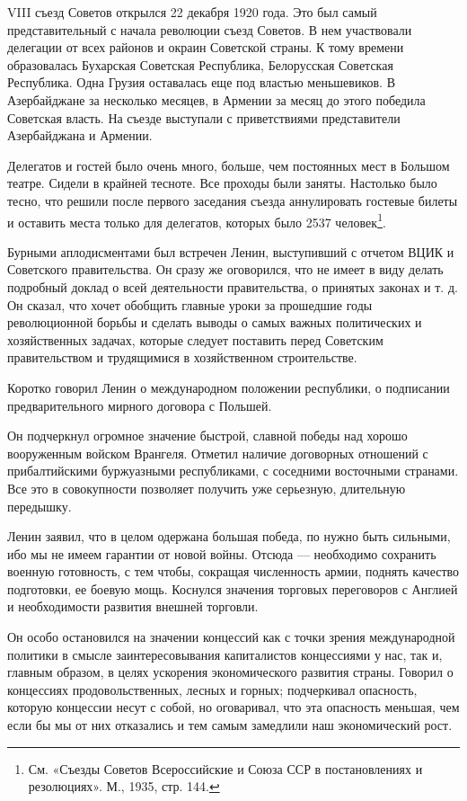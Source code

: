 \documentclass[12pt, a4paper, openany]{book}
\begin{document}
VIII съезд Советов открылся 22 декабря 1920 года. Это был самый представительный с начала революции съезд Советов. В нем участвовали делегации от всех районов и окраин Советской страны. К тому времени образовалась Бухарская Советская Республика, Белорусская Советская Республика. Одна Грузия оставалась еще под властью меньшевиков. В Азербайджане за несколько месяцев, в Армении за месяц до этого победила Советская власть. На съезде выступали с приветствиями представители Азербайджана и Армении.

Делегатов и гостей было очень много, больше, чем постоянных мест в Большом театре. Сидели в крайней тесноте. Все проходы были заняты. Настолько было тесно, что решили после первого заседания съезда аннулировать гостевые билеты и оставить места только для делегатов, которых было 2537 человек\footnote{См. «Съезды Советов Всероссийские и Союза ССР в постановлениях и резолюциях». М., 1935, стр. 144.}.

Бурными аплодисментами был встречен Ленин, выступивший с отчетом ВЦИК и Советского правительства. Он сразу же оговорился, что не имеет в виду делать подробный доклад о всей деятельности правительства, о принятых законах и т. д. Он сказал, что хочет обобщить главные уроки за прошедшие годы революционной борьбы и сделать выводы о самых важных политических и хозяйственных задачах, которые следует поставить перед Советским правительством и трудящимися в хозяйственном строительстве.

Коротко говорил Ленин о международном положении республики, о подписании предварительного мирного договора с Польшей.

Он подчеркнул огромное значение быстрой, славной победы над хорошо вооруженным войском Врангеля. Отметил наличие договорных отношений с прибалтийскими буржуазными республиками, с соседними восточными странами. Все это в совокупности позволяет получить уже серьезную, длительную передышку.

Ленин заявил, что в целом одержана большая победа, по нужно быть сильными, ибо мы не имеем гарантии от новой войны. Отсюда — необходимо сохранить военную готовность, с тем чтобы, сокращая численность армии, поднять качество подготовки, ее боевую мощь. Коснулся значения торговых переговоров с Англией и необходимости развития внешней торговли.

Он особо остановился на значении концессий как с точки зрения международной политики в смысле заинтересовывания капиталистов концессиями у нас, так и, главным образом, в целях ускорения экономического развития страны. Говорил о концессиях продовольственных, лесных и горных; подчеркивал опасность, которую концессии несут с собой, но оговаривал, что эта опасность меньшая, чем если бы мы от них отказались и тем самым замедлили наш экономический рост.
\end{document}
